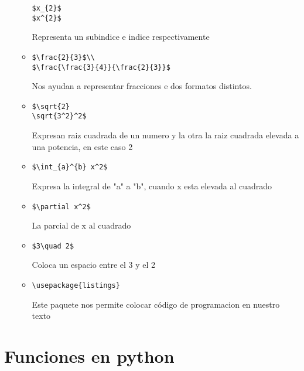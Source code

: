 \documentclass{book}
\begin{document}
\begin{enumerate}
\begin{itemize}
		\begin{lstlisting}  
$x_{2}$
$x^{2}$
		\end{lstlisting}  Representa un subindice e indice respectivamente
		\item 
		\begin{lstlisting}  
$\frac{2}{3}$\\
$\frac{\frac{3}{4}}{\frac{2}{3}}$
		\end{lstlisting} Nos ayudan a representar fracciones e dos formatos distintos.
		\item
		\begin{lstlisting}  
$\sqrt{2} 
\sqrt{3^2}^2$
		\end{lstlisting} Expresan raiz cuadrada de un numero y la otra la raiz cuadrada elevada a una potencia, en este caso 2
		\item
		\begin{lstlisting} 
$\int_{a}^{b} x^2$
		\end{lstlisting} Expresa la integral de "a" a "b", cuando x esta elevada al cuadrado
		\item
		\begin{lstlisting}  
$\partial x^2$
		\end{lstlisting} La parcial de x al cuadrado
		\item
		\begin{lstlisting} 
$3\quad 2$ 			
		\end{lstlisting} Coloca un espacio entre el 3 y el 2
		\item
		\begin{lstlisting} 
\usepackage{listings}			
		\end{lstlisting} Este paquete nos permite colocar código de programacion en nuestro texto
		
		
		
		
		
	\end{itemize}
	
	
	
	
\end{enumerate}%





\section{Funciones en python}%
\begin{flushright}
	\date{16 de enero de 2019}
\end{flushright}
\end{document}
